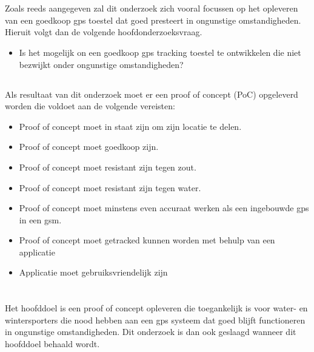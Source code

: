 \section{}
\subsection{}
\label{sec:onderzoeksvraag}

Zoals reeds aangegeven zal dit onderzoek zich vooral focussen op het opleveren van een goedkoop gps toestel dat goed presteert in ongunstige omstandigheden. Hieruit volgt dan de volgende hoofdonderzoeksvraag.
\newline
\begin{itemize}
	\item Is het mogelijk on een goedkoop gps tracking toestel te ontwikkelen die niet bezwijkt onder ongunstige omstandigheden?
\end{itemize}

\subsection{}
Als resultaat van dit onderzoek moet er een proof of concept (PoC) opgeleverd worden die voldoet aan de volgende vereisten:
\begin{itemize}
	\item Proof of concept moet in staat zijn om zijn locatie te delen.
	\item Proof of concept moet goedkoop zijn.
	\item Proof of concept moet resistant zijn tegen zout.
	\item Proof of concept moet resistant zijn tegen water. 
	\item Proof of concept moet minstens even accuraat werken als een ingebouwde gps in een gsm.
	\item Proof of concept moet getracked kunnen worden met behulp van een applicatie
	\item Applicatie moet gebruiksvriendelijk zijn
\end{itemize}

\section{}
\label{sec:onderzoeksdoelstelling}
Het hoofddoel is een proof of concept opleveren die toegankelijk is voor water- en wintersporters die nood hebben aan een gps systeem dat goed blijft functioneren in ongunstige omstandigheden. Dit onderzoek is dan ook geslaagd wanneer dit hoofddoel behaald wordt.


